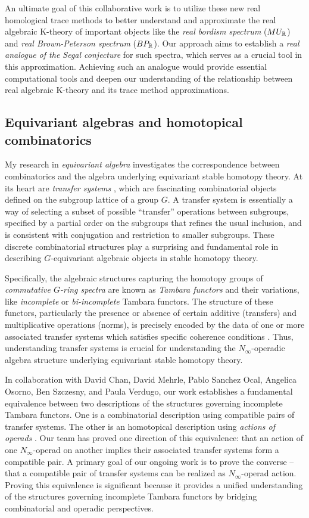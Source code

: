 \documentclass[11pt]{article}
\begin{document}
An ultimate goal of this collaborative work is to utilize these new real homological trace methods to better understand and approximate the real algebraic K-theory of important objects like the {\it real bordism spectrum} ($MU_{\mathbb{R}}$) and {\it real Brown-Peterson spectrum} ($BP_{\mathbb{R}}$). Our approach aims to establish a {\it real analogue of the Segal conjecture} for such spectra, which serves as a crucial tool in this approximation. Achieving such an analogue would provide essential computational tools and deepen our understanding of the relationship between real algebraic K-theory and its trace method approximations.


\subsection{Equivariant algebras and homotopical combinatorics}
My research in {\it equivariant algebra} investigates the correspondence between combinatorics and the algebra underlying equivariant stable homotopy theory. At its heart are {\it transfer systems} \cite{MR4244201}, which are fascinating combinatorial objects defined on the subgroup lattice of a group $G$. A transfer system is essentially a way of selecting a subset of possible ``transfer'' operations between subgroups, specified by a partial order on the subgroups that refines the usual inclusion, and is consistent with conjugation and restriction to smaller subgroups. These discrete combinatorial structures play a surprising and fundamental role in describing $G$-equivariant algebraic objects in stable homotopy theory.

Specifically, the algebraic structures capturing the homotopy groups of {\it commutative $G$-ring spectra} are known as {\it Tambara functors} \cite{MR1209937} and their variations, like {\it incomplete} or {\it bi-incomplete} Tambara functors\cite{MR3773736,MR4327103}. The structure of these functors, particularly the presence or absence of certain additive (transfers) and multiplicative operations (norms), is precisely encoded by the data of one or more associated transfer systems which satisfies specific coherence conditions \cite{MR4696086}. Thus, understanding transfer systems is crucial for understanding the $N_\infty$-operadic algebra structure underlying equivariant stable homotopy theory.

In collaboration with David Chan, David Mehrle, Pablo Sanchez Ocal, Angelica Osorno, Ben Szczesny, and Paula Verdugo, our work establishes a fundamental equivalence between two descriptions of the structures governing incomplete Tambara functors. One is a combinatorial description using compatible pairs of transfer systems. The other is an homotopical description using {\it actions of operads} \cite{MR2544392}. Our team has proved one direction of this equivalence: that an action of one $N_\infty$-operad on another implies their associated transfer systems form a compatible pair. A primary goal of our ongoing work is to prove the converse – that a compatible pair of transfer systems can be realized as $N_\infty$-operad action. Proving this equivalence is significant because it provides a unified understanding of the structures governing incomplete Tambara functors by bridging combinatorial and operadic perspectives. 
\end{document}

